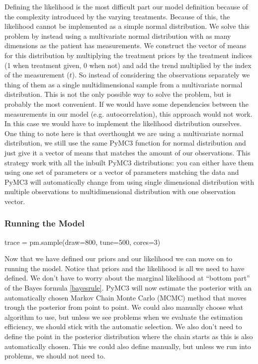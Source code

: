 \documentclass[12pt,a4paper,leqno]{report}
\theoremstyle{plain}
\theoremstyle{definition}
\theoremstyle{remark}
\begin{document}
Defining the likelihood is the most difficult part our model definition because of the
complexity introduced by the varying treatments. Because of this, the likelihood cannot
be implemented as a simple normal distribution. We solve this problem by instead using a
multivariate normal distribution with as many dimensions as the patient has
measurements. We construct the vector of
means for this distribution by multiplying the treatment priors by the treatment indices (1 when
treatment given, 0 when not) and add the trend multiplied by the index of the
measurement (\(t\)). So instead of considering
the observations separately we thing of them as a single multidimensional sample from
a multivariate normal distribution. This is not the only possible way to solve the
problem, but is probably the most convenient. If we would have some
dependencies between the measurements in our model (e.g. autocorrelation), this approach
would not work. In this case we would have to implement the likelihood distribution
ourselves. One thing to note here is that overthought we are using a multivariate normal
distribution, we still use the same PyMC3 function for normal distribution and just give
it a vector of means that matches the amount of our observations. This strategy work
with all the inbuilt PyMC3 distributions: you can either have them using one set of
parameters or a vector of parameters matching the data and PyMC3 will automatically
change from using single dimensional distribution with multiple observations to
multidimensional distribution with one observation vector.

\subsubsection{Running the Model}

\bigskip
\begin{pyverbatim}
trace = pm.sample(draw=800, tune=500, cores=3)
\end{pyverbatim}
\bigskip


Now that we have defined our priors and our likelihood we can move on to running the
model. Notice that priors and the likelihood is all we need to have defined. We don't
have to worry about the marginal likelihood at ``bottom part'' of the Bayes formula \ref{bayesrule}. PyMC3 will
now estimate the posterior with an automatically chosen Markov Chain Monte Carlo (MCMC) method
that moves trough the posterior from point to point. We could also manually choose what
algorithm to use, but unless we see problems when we evaluate the estimation efficiency,
we should stick with the automatic selection. We also don't need to define the point in the
posterior distribution where the chain starts as this is also automatically chosen. This
we could also define manually, but unless we run into problems, we should not need to.
\end{document}
